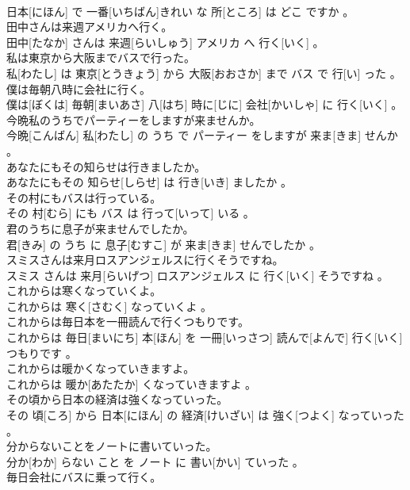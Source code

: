 \documentclass[8pt]{extreport}
\begin{document}
\begin{CJK}{UTF8}{min}
\\	日本[にほん] で 一番[いちばん]きれい な 所[ところ] は どこ ですか 。
\\	田中さんは来週アメリカへ行く。	
\\	田中[たなか] さんは 来週[らいしゅう] アメリカ へ 行く[いく] 。
\\	私は東京から大阪までバスで行った。	
\\	私[わたし] は 東京[とうきょう] から 大阪[おおさか] まで バス で 行[い] った 。
\\	僕は毎朝八時に会社に行く。	
\\	僕は[ぼくは] 毎朝[まいあさ] 八[はち] 時に[じに] 会社[かいしゃ] に 行く[いく] 。
\\	今晩私のうちでパーティーをしますが来ませんか。	
\\	今晩[こんばん] 私[わたし] の うち で パーティー をしますが 来ま[きま] せんか 。
\\	あなたにもその知らせは行きましたか。	
\\	あなたにもその 知らせ[しらせ] は 行き[いき] ましたか 。
\\	その村にもバスは行っている。	
\\	その 村[むら] にも バス は 行って[いって] いる 。
\\	君のうちに息子が来ませんでしたか。	
\\	君[きみ] の うち に 息子[むすこ] が 来ま[きま] せんでしたか 。
\\	スミスさんは来月ロスアンジェルスに行くそうですね。	
\\	スミス さんは 来月[らいげつ] ロスアンジェルス に 行く[いく] そうですね 。
\\	これからは寒くなっていくよ。	
\\	これからは 寒く[さむく] なっていくよ 。
\\	これからは毎日本を一冊読んで行くつもりです。	
\\	これからは 毎日[まいにち] 本[ほん] を 一冊[いっさつ] 読んで[よんで] 行く[いく]つもりです 。
\\	これからは暖かくなっていきますよ。	
\\	これからは 暖か[あたたか] くなっていきますよ 。
\\	その頃から日本の経済は強くなっていった。	
\\	その 頃[ころ] から 日本[にほん] の 経済[けいざい] は 強く[つよく] なっていった 。
\\	分からないことをノートに書いていった。	
\\	分か[わか] らない こと を ノート に 書い[かい] ていった 。
\\	毎日会社にバスに乗って行く。	

\end{CJK}
\end{document}
